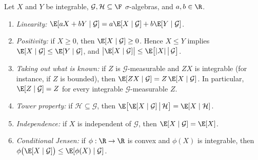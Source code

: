 \begin{proposition}\label{prop:pr-condexp-properties}
Let $X$ and $Y$ be integrable, $\mathcal G,\mathcal H\subseteq\F$ $\sigma$-algebras, and
$a,b\in\R$.
\begin{enumerate}[label=(\roman*)]
  \item \emph{Linearity:} $\E[aX+bY\mid\mathcal G]=a\E[X\mid\mathcal G]+b\E[Y\mid\mathcal G]$.
  \item \emph{Positivity:} if $X\ge0$, then $\E[X\mid\mathcal G]\ge0$. Hence $X\le Y$ implies
    $\E[X\mid\mathcal G]\le\E[Y\mid\mathcal G]$, and
    $\big|\E[X\mid\mathcal G]\big|\le\E\big[|X|\,\big|\,\mathcal G\big]$.
  \item \emph{Taking out what is known:} if $Z$ is $\mathcal G$-measurable and $ZX$ is
    integrable (for instance, if $Z$ is bounded), then
    $\E[ZX\mid\mathcal G]=Z\,\E[X\mid\mathcal G]$. In particular,
    $\E[Z\mid\mathcal G]=Z$ for every integrable $\mathcal G$-measurable $Z$.
  \item \emph{Tower property:} if $\mathcal H\subseteq\mathcal G$, then
    $\E\big[\E[X\mid\mathcal G]\,\big|\,\mathcal H\big]=\E[X\mid\mathcal H]$.
  \item \emph{Independence:} if $X$ is independent of $\mathcal G$, then
    $\E[X\mid\mathcal G]=\E[X]$.
  \item \emph{Conditional Jensen:} if $\phi:\R\to\R$ is convex and $\phi(X)$ is integrable,
    then $\phi\big(\E[X\mid\mathcal G]\big)\le\E[\phi(X)\mid\mathcal G]$.
\end{enumerate}
\end{proposition}

